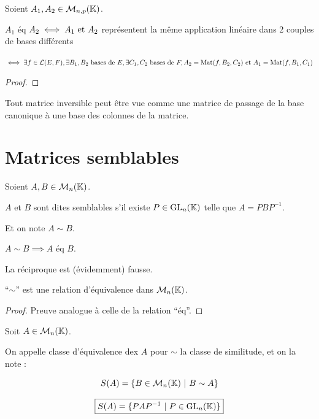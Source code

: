 \documentclass[12pt, a4paper]{report}
\begin{document}
\begin{property}
    Soient $A_1,A_2 \in \mathcal M_{n,p}(\mathbb{K})$.

    $A_1$ éq $A_2 \iff A_1 \text{ et } A_2$ représentent la même application linéaire dans 2 couples de bases différents

    $\iff \exists f \in \mathcal L(E,F), \exists B_1,B_2 \text{ bases de } E, \exists C_1,C_2 \text{ bases de } F, A_2 = \mathrm{Mat}(f,B_2,C_2) \text{ et } A_1 = \mathrm{Mat}(f,B_1,C_1)$
\end{property}

\begin{proof}
    
\end{proof}

\begin{methodbox}
    Tout matrice inversible peut être vue comme une matrice de passage de la base canonique à une base des colonnes de la matrice.
\end{methodbox}

\section{Matrices semblables}

\begin{definition}
    Soient $A,B \in \mathcal M_n(\mathbb{K})$.

    $A$ et $B$ sont dites semblables s'il existe $P \in \mathrm{GL}_n(\mathbb{K})$ telle que $A = P B P^{-1}$.

    Et on note $A \sim B$.
\end{definition}

\begin{remark}
    $A \sim B \implies A \text{ éq } B$.
    
    La réciproque est (évidemment) fausse.
\end{remark}

\begin{property}
    ``$\sim$'' est une relation d'équivalence dans $\mathcal M_n(\mathbb{K})$.
\end{property}

\begin{proof}
    Preuve analogue à celle de la relation ``éq''.
\end{proof}

\begin{remark}
    Soit $A \in \mathcal M_n(\mathbb{K})$.

    On appelle classe d'équivalence dex $A$ pour $\sim$ la classe de similitude, et on la note :

    $$S(A) = \{B \in \mathcal M_n(\mathbb{K})~|~B \sim A\}$$

    $$\boxed{S(A) = \{P A P^{-1}~|~P \in \mathrm{GL}_n(\mathbb{K})\}}$$
\end{remark}
\end{document}
